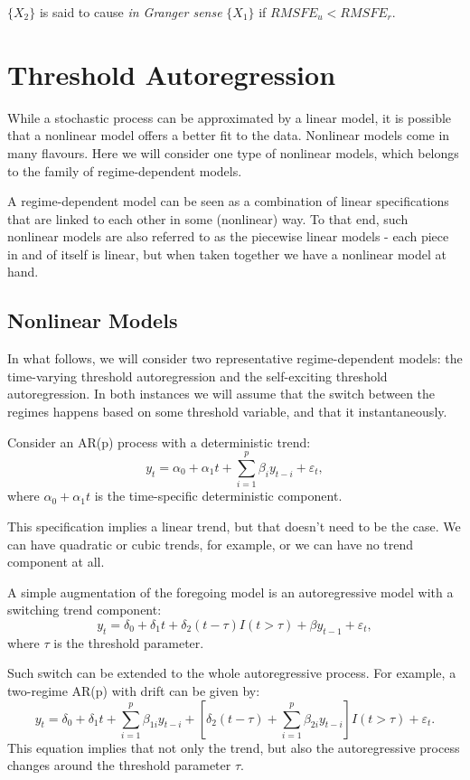 \documentclass[
  oneside]{book}
\begin{document}
\(\{X_2\}\) is said to cause \emph{in Granger sense} \(\{X_1\}\) if \(RMSFE_{u} < RMSFE_{r}\).

\hypertarget{threshold-autoregression}{%
\chapter{Threshold Autoregression}\label{threshold-autoregression}}

While a stochastic process can be approximated by a linear model, it is possible that a nonlinear model offers a better fit to the data. Nonlinear models come in many flavours. Here we will consider one type of nonlinear models, which belongs to the family of regime-dependent models.

A regime-dependent model can be seen as a combination of linear specifications that are linked to each other in some (nonlinear) way. To that end, such nonlinear models are also referred to as the piecewise linear models - each piece in and of itself is linear, but when taken together we have a nonlinear model at hand.

\hypertarget{nonlinear-models}{%
\section{Nonlinear Models}\label{nonlinear-models}}

In what follows, we will consider two representative regime-dependent models: the time-varying threshold autoregression and the self-exciting threshold autoregression. In both instances we will assume that the switch between the regimes happens based on some threshold variable, and that it instantaneously.

Consider an AR(p) process with a deterministic trend: \[y_t = \alpha_0 + \alpha_1 t + \sum_{i=1}^{p}\beta_i y_{t-i} + \varepsilon_t,\] where \(\alpha_0 + \alpha_1 t\) is the time-specific deterministic component.

This specification implies a linear trend, but that doesn't need to be the case. We can have quadratic or cubic trends, for example, or we can have no trend component at all.

A simple augmentation of the foregoing model is an autoregressive model with a switching trend component: \[y_t = \delta_{0} + \delta_{1} t + \delta_{2}(t-\tau)I(t>\tau) + \beta y_{t-1} + \varepsilon_t,\] where \(\tau\) is the threshold parameter.

Such switch can be extended to the whole autoregressive process. For example, a two-regime AR(p) with drift can be given by: \[y_t = \delta_0 + \delta_1 t + \sum_{i=1}^{p}\beta_{1i} y_{t-i} + \left[\delta_2(t-\tau) + \sum_{i=1}^{p}\beta_{2i} y_{t-i}\right]I(t>\tau) + \varepsilon_t.\] This equation implies that not only the trend, but also the autoregressive process changes around the threshold parameter \(\tau\).
\end{document}
